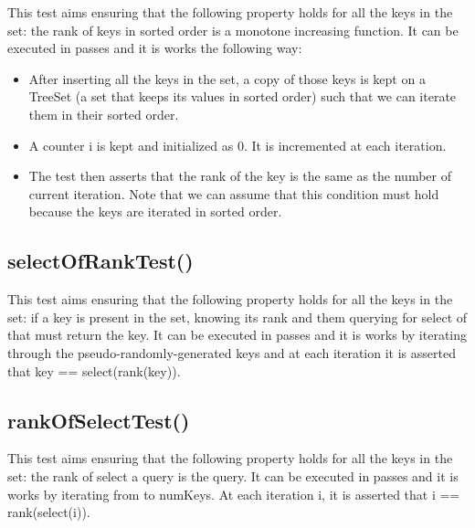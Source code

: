 This test aims ensuring that the following property holds for all the keys in the set: the rank of keys in sorted order is a monotone increasing function. It can be executed in passes and it is works the following way:
\begin{itemize}
    \item
    After inserting all the keys in the set, a copy of those keys is kept on a {\ttfamily TreeSet} (a set that keeps its values in sorted order) such that we can iterate them in their sorted order.
    \item
    A counter {\ttfamily i} is kept and initialized as $0$. It is incremented at each iteration.
    \item
    The test then asserts that the rank of the key is the same as the number of current iteration. Note that we can assume that this condition must hold because the keys are iterated in sorted order. 
\end{itemize}

\subsection{{\ttfamily selectOfRankTest()}}

This test aims ensuring that the following property holds for all the keys in the set: if a key is present in the set, knowing its rank and them querying for select of that must return the key. It can be executed in passes and it is works by iterating through the pseudo-randomly-generated keys and at each iteration it is asserted that {\ttfamily key == select(rank(key))}.

\subsection{{\ttfamily rankOfSelectTest()}}

This test aims ensuring that the following property holds for all the keys in the set: the rank of select a query is the query. It can be executed in passes and it is works by iterating from {} to {\ttfamily numKeys}. At each iteration {\ttfamily i}, it is asserted that {\ttfamily i == rank(select(i))}.